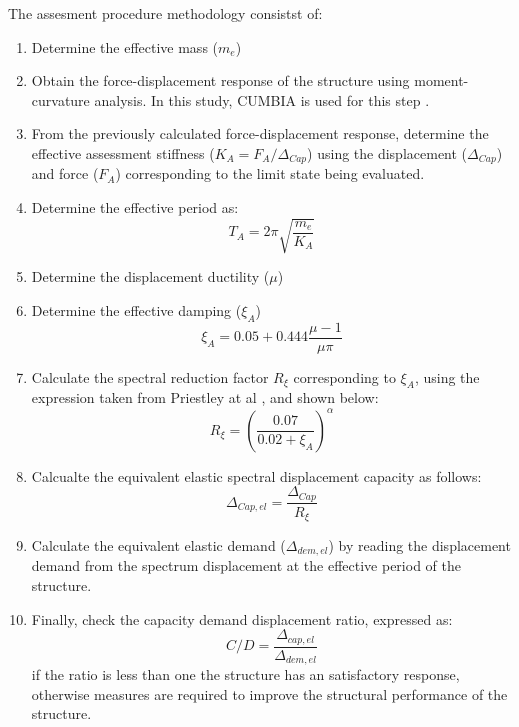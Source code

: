 The assesment procedure methodology consistst of:
\begin{enumerate}
    \item Determine the effective mass ($m_{e}$)
    \item Obtain the force-displacement response of the structure using moment-curvature analysis. In this study, CUMBIA is used for this step \cite{Montejo2007}.
    \item From the previously calculated force-displacement response, determine the effective assessment stiffness ($K_{A}=F_{A}/\Delta_{Cap}$) using the displacement ($\Delta_{Cap}$) and force ($F_{A}$) corresponding to the limit state being evaluated.
    \item Determine the effective period as:
    \begin{equation}
        T_{A}=2\pi \sqrt{\frac{m_{e}}{K_{A}}}
    \end{equation}
    \item Determine the displacement ductility ($\mu$)
    \item Determine the effective damping ($\xi_{A}$)
    \begin{equation}
        \xi_{A}=0.05+0.444\frac{\mu-1}{\mu\pi}
    \end{equation}
    \item Calculate the spectral reduction factor $R_{\xi}$ corresponding to $\xi_{A}$, using the expression taken from Priestley at al \cites{Priestley2007}, and shown below:
    \begin{equation}
        R_{\xi}=\left(\frac{0.07}{0.02+\xi_{A}}\right)^{\alpha}
    \end{equation}
    \item Calcualte the equivalent elastic spectral displacement capacity as follows:
    \begin{equation}
        \Delta_{Cap,el}=\frac{\Delta_{Cap}}{R_{\xi}}
    \end{equation}
    \item Calculate the equivalent elastic demand ($\Delta_{dem,el}$) by reading the displacement demand from the spectrum displacement at the effective period of the structure. 
    \item Finally, check the capacity demand displacement ratio, expressed as: 
    \begin{equation}
        C/D= \frac{\Delta_{cap,el}}{\Delta_{dem,el}}
    \end{equation}
    if the ratio is less than one the structure has an satisfactory response, otherwise measures are required to improve the structural performance of the structure.
\end{enumerate}

